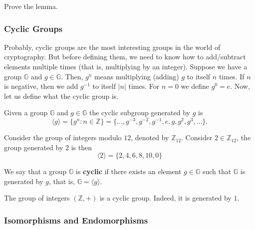 \documentclass[../lecture-notes.tex]{subfiles}
\begin{document}
\begin{exercise}
    Prove the lemma.
\end{exercise}

\subsubsection{Cyclic Groups}

Probably, cyclic groups are the most interesting groups in the world of cryptography. But before defining them, we need to know how to add/subtract elements multiple times (that is, multiplying by an integer). Suppose 
we have a group $\mathbb{G}$ and $g \in \mathbb{G}$. Then, $g^n$ means multiplying (adding) $g$ to itself $n$ times. If $n$ is negative, then we add $g^{-1}$ to itself $|n|$ times. For $n=0$ we define $g^0 = e$. Now, let us define what the cyclic group is.
\begin{definition}
    Given a group $\mathbb{G}$ and $g \in \mathbb{G}$ the cyclic subgroup generated by $g$ is
    \begin{equation}
        \langle g \rangle = \{g^n: n \in \mathbb{Z}\} = \{\dots,g^{-3}, g^{-2}, g^{-1}, e, g, g^2, g^3, \dots\}.
    \end{equation}
\end{definition}

\begin{example}
    Consider the group of integers modulo $12$, denoted by $\mathbb{Z}_{12}$. Consider $2 \in \mathbb{Z}_{12}$, the group generated by $2$ is then
    \begin{equation}
        \langle 2 \rangle = \{2,4,6,8,10, 0\}
    \end{equation}
\end{example}

\begin{definition}
    We say that a group $\mathbb{G}$ is \textbf{cyclic} if there exists an element $g \in \mathbb{G}$ such that $\mathbb{G}$ is generated by $g$, that is, $\mathbb{G} = \langle g \rangle$.
\end{definition}

\begin{example}
    The group of integers $(\mathbb{Z},+)$ is a cyclic group. Indeed, it is generated by $1$.
\end{example}

\subsubsection{Isomorphisms and Endomorphisms}
\end{document}
